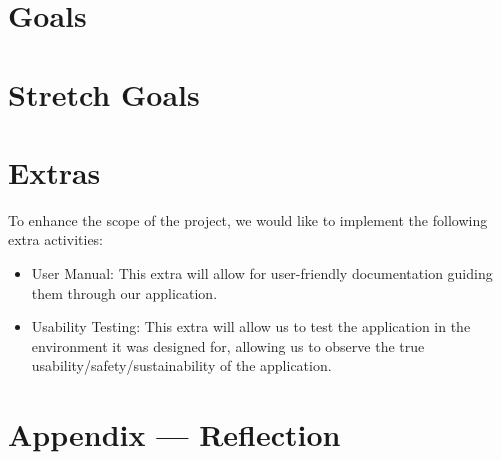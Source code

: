 \documentclass{article}
\begin{document}
\section{Goals}

\section{Stretch Goals}

\section{Extras} 

To enhance the scope of the project, we would like to implement the following extra
activities:
\begin{itemize}
\item User Manual: This extra will allow for user-friendly documentation guiding them 
through our application.
\item Usability Testing: This extra will allow us to test the application in the environment
it was designed for, allowing us to observe the true usability/safety/sustainability of the application.
\end{itemize}


\newpage{}

\section*{Appendix --- Reflection}



\end{document}
